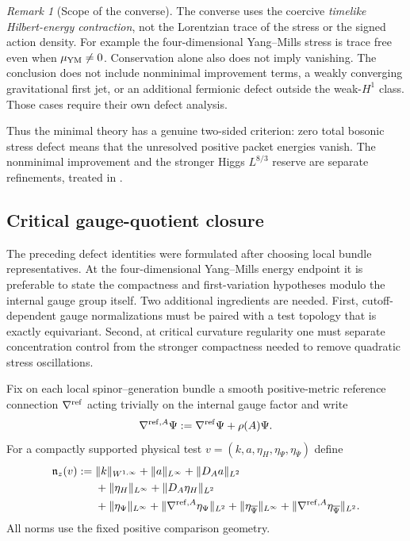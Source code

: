 \documentclass[11pt]{article}
\numberwithin{equation}{section}
\theoremstyle{definition}
\theoremstyle{remark}
\newtheorem{remark}[remark]{Remark}
\newcommand{\norm}[1]{\lVert#1\rVert}
\newcommand{\bPsi}{\overline\Psi}
\begin{document}
\begin{remark}[Scope of the converse]
The converse uses the coercive \emph{timelike Hilbert-energy contraction},
not the Lorentzian trace of the stress or the signed action density.
For example the four-dimensional Yang--Mills stress is trace free even when
$\mu_{\rm YM}\ne0$.  Conservation alone also does not imply vanishing.
The conclusion does not include nonminimal improvement terms, a weakly
converging gravitational first jet, or an additional fermionic defect outside
the weak-$H^1$ class.  Those cases require their own defect analysis.
\end{remark}

Thus the minimal theory has a genuine two-sided criterion: zero total
bosonic stress defect means that the unresolved positive packet energies
vanish. The nonminimal improvement and the stronger Higgs
$L^{8/3}$ reserve are separate refinements, treated in
.

\subsection{Critical gauge-quotient closure}
\label{subsec:critical-quotient}

The preceding defect identities were formulated after choosing local bundle
representatives.  At the four-dimensional Yang--Mills energy endpoint it is
preferable to state the compactness and first-variation hypotheses modulo the
internal gauge group itself.  Two additional ingredients are needed.  First,
cutoff-dependent gauge normalizations must be paired with a test topology that
is exactly equivariant.  Second, at critical curvature regularity one must
separate concentration control from the stronger compactness needed to remove
quadratic stress oscillations.

Fix on each local spinor--generation bundle a smooth positive-metric reference
connection $\nabla^{\rm ref}$ acting trivially on the internal gauge factor and
write
\begin{equation}
 \nabla^{{\rm ref},A}\Psi
 :=\nabla^{\rm ref}\Psi+\rho(A)\Psi.
 \label{eq:reference-gauge-spin-derivative}
\end{equation}
For a compactly supported physical test
$v=(k,a,\eta_H,\eta_\Psi,\eta_{\bPsi})$ define
\begin{align}
 \mathfrak n_z(v)
 :={}&\norm{k}_{W^{1,\infty}}
 +\norm a_{L^\infty}+\norm{D_Aa}_{L^2}\notag\\
 &+\norm{\eta_H}_{L^\infty}+\norm{D_A\eta_H}_{L^2}\notag\\
 &+\norm{\eta_\Psi}_{L^\infty}
   +\norm{\nabla^{{\rm ref},A}\eta_\Psi}_{L^2}
 +\norm{\eta_{\bPsi}}_{L^\infty}
   +\norm{\nabla^{{\rm ref},A}\eta_{\bPsi}}_{L^2}.
 \label{eq:equivariant-test-size}
\end{align}
All norms use the fixed positive comparison geometry.
\end{document}
